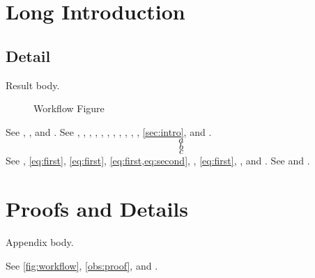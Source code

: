 \section[Short Intro]{Long Introduction}\label{sec:intro}
\subsection[Detail]{Detail}\label{sub:detail}
\begin{oblemma}\label{obs:main}
Result body.
\end{oblemma}
\begin{figure}\caption[Workflow Short]{Workflow Figure}\label{fig:workflow}\end{figure}
See , , and .
See , , , , , , , , , , , \vref{sec:intro}, and .
\begin{equation}\label{eq:first}a\end{equation}
\begin{equation}\label{eq:second}b\end{equation}
\begin{equation}\label{eq:third}c\end{equation}
See , \eqref{eq:first}, \autoref{eq:first}, \cref{eq:first,eq:second}, , \vref{eq:first}, , and .
See  and .
\appendices
\section[Proof Notes]{Proofs and Details}\label{sec:proof}
\begin{oblemma}\label{obs:proof}
Appendix body.
\end{oblemma}
See \autoref{fig:workflow}, \cref{obs:proof}, and .
